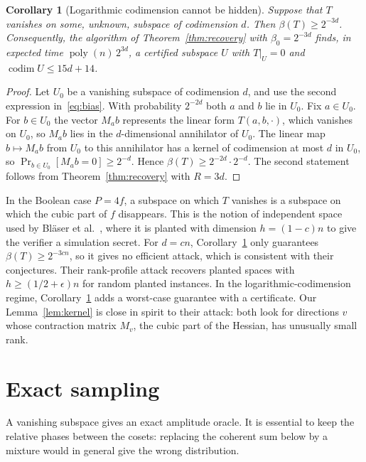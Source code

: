 \documentclass[a4paper,onecolumn,11pt,unpublished]{quantumarticle}
\theoremstyle{plain}
\newtheorem{corollary}[theorem]{Corollary}
\theoremstyle{remark}
\DeclareMathOperator{\codim}{codim}
\DeclareMathOperator{\poly}{poly}
\begin{document}
\begin{corollary}[Logarithmic codimension cannot be hidden]\label{cor:planted}
Suppose that $T$ vanishes on some, unknown, subspace of codimension $d$. Then $\beta(T)\ge2^{-3d}$. Consequently, the algorithm of Theorem~\ref{thm:recovery} with $\beta_0=2^{-3d}$ finds, in expected time $\poly(n)\,2^{3d}$, a certified subspace $U$ with $T|_U=0$ and $\codim U\le15d+14$.
\end{corollary}

\begin{proof}
Let $U_0$ be a vanishing subspace of codimension $d$, and use the second expression in~\eqref{eq:bias}. With probability $2^{-2d}$ both $a$ and $b$ lie in $U_0$. Fix $a\in U_0$. For $b\in U_0$ the vector $M_ab$ represents the linear form $T(a,b,\cdot)$, which vanishes on $U_0$, so $M_ab$ lies in the $d$-dimensional annihilator of $U_0$. The linear map $b\mapsto M_ab$ from $U_0$ to this annihilator has a kernel of codimension at most $d$ in $U_0$, so $\Pr_{b\in U_0}[M_ab=0]\ge2^{-d}$. Hence $\beta(T)\ge2^{-2d}\cdot2^{-d}$. The second statement follows from Theorem~\ref{thm:recovery} with $R=3d$.
\end{proof}

In the Boolean case $P=4f$, a subspace on which $T$ vanishes is a subspace on which the cubic part of $f$ disappears. This is the notion of independent space used by Bl\"aser et al.~\cite{BGHLQ26}, where it is planted with dimension $h=(1-c)n$ to give the verifier a simulation secret. %
For $d=cn$, Corollary~\ref{cor:planted} only guarantees $\beta(T)\ge2^{-3cn}$, so it gives no efficient attack, which is consistent with their conjectures. Their rank-profile attack recovers planted spaces with $h\ge(1/2+\epsilon)n$ for random planted instances. In the logarithmic-codimension regime, Corollary~\ref{cor:planted} adds a worst-case guarantee with a certificate. Our Lemma~\ref{lem:kernel} is close in spirit to their attack: both look for directions $v$ whose contraction matrix $M_v$, the cubic part of the Hessian, has unusually small rank.

\section{Exact sampling}\label{sec:sampling}

A vanishing subspace gives an exact amplitude oracle. It is essential to keep the relative phases between the cosets: replacing the coherent sum below by a mixture would in general give the wrong distribution.
\end{document}
